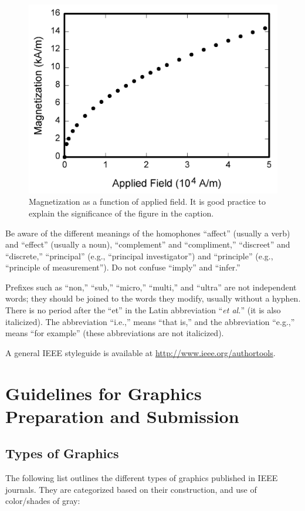 \documentclass[journal,twoside,web]{ieeecolor2}
\begin{document}
\begin{figure}[!t]
\centerline{\includegraphics[width=\columnwidth]{fig1.png}}
\caption{Magnetization as a function of applied field.
It is good practice to explain the significance of the figure in the caption.}
\label{fig1}
\end{figure}

Be aware of the different meanings of the homophones ``affect'' (usually a 
verb) and ``effect'' (usually a noun), ``complement'' and ``compliment,'' 
``discreet'' and ``discrete,'' ``principal'' (e.g., ``principal 
investigator'') and ``principle'' (e.g., ``principle of measurement''). Do 
not confuse ``imply'' and ``infer.'' 

Prefixes such as ``non,'' ``sub,'' ``micro,'' ``multi,'' and ``ultra'' are 
not independent words; they should be joined to the words they modify, 
usually without a hyphen. There is no period after the ``et'' in the Latin 
abbreviation ``\emph{et al.}'' (it is also italicized). The abbreviation ``i.e.,'' means 
``that is,'' and the abbreviation ``e.g.,'' means ``for example'' (these 
abbreviations are not italicized).

A general IEEE styleguide is available at \underline{http://www.ieee.org/authortools}.

\section{Guidelines for Graphics Preparation and Submission}
\label{sec:guidelines}

\subsection{Types of Graphics}
The following list outlines the different types of graphics published in 
IEEE journals. They are categorized based on their construction, and use of 
color/shades of gray:
\end{document}
